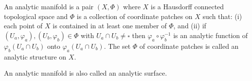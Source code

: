 An analytic manifold is a pair $(X, \Phi)$ where $X$ is a Hausdorff connected topological space and $\Phi$ is a collection of coordinate patches on $X$ such that:
(i) each point of $X$ is contained in at least one member of $\Phi$, and
(ii) if $(U_a, \varphi_a), (U_b, \varphi_b) \in \Phi$ with $U_a \cap U_b \neq \square$ then $\varphi_a \circ \varphi_b^{-1}$ is an analytic function of $\varphi_b(U_a \cap U_b)$ onto $\varphi_a(U_a \cap U_b)$.
The set $\Phi$ of coordinate patches is called an analytic structure on $X$.

An analytic manifold is also called an analytic surface.
